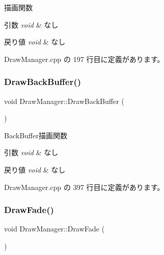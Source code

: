 描画関数 


\begin{DoxyParams}{引数}
{\em void} & なし \\
\hline
\end{DoxyParams}

\begin{DoxyRetVals}{戻り値}
{\em void} & なし \\
\hline
\end{DoxyRetVals}


 Draw\+Manager.\+cpp の 197 行目に定義があります。

\mbox{\label{class_draw_manager_ae2af73eab7153bb2e00084ed136e0780}} 
\subsubsection{\texorpdfstring{Draw\+Back\+Buffer()}{DrawBackBuffer()}}
{\footnotesize\ttfamily void Draw\+Manager\+::\+Draw\+Back\+Buffer (\begin{DoxyParamCaption}{ }\end{DoxyParamCaption})\hspace{0.3cm}{\ttfamily [private]}}



Back\+Buffer描画関数 


\begin{DoxyParams}{引数}
{\em void} & なし \\
\hline
\end{DoxyParams}

\begin{DoxyRetVals}{戻り値}
{\em void} & なし \\
\hline
\end{DoxyRetVals}


 Draw\+Manager.\+cpp の 397 行目に定義があります。

\mbox{\label{class_draw_manager_a1585a2a0bfa05d7b1e00a51636c460af}} 
\subsubsection{\texorpdfstring{Draw\+Fade()}{DrawFade()}}
{\footnotesize\ttfamily void Draw\+Manager\+::\+Draw\+Fade (\begin{DoxyParamCaption}{ }\end{DoxyParamCaption})\hspace{0.3cm}{\ttfamily [private]}}



